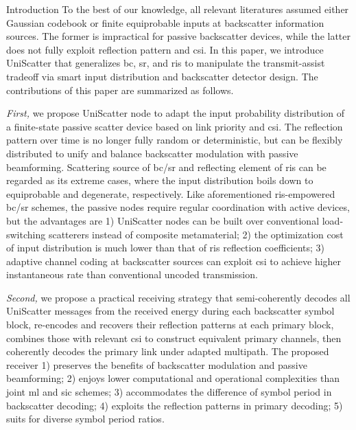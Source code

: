 \documentclass[journal]{IEEEtran}
\begin{document}
\begin{section}{Introduction}
	To the best of our knowledge, all relevant literatures assumed either Gaussian codebook \cite{Guo2019b,Ding2020,Long2020a,Zhou2019a,Wu2021a,Xu2021a,Yang2021a,Hu2021b} or finite equiprobable inputs \cite{Yang2018,Liang2020,Han2021,Zhang2022,Liu2019d,Bereyhi2020,Xu2020b,Zhang2021d,Hua2022,Basar2020,Ma2020a,Yuan2021,Hu2021a} at backscatter information sources.
	The former is impractical for passive backscatter devices, while the latter does not fully exploit reflection pattern and \gls{csi}.
	In this paper, we introduce UniScatter that generalizes \gls{bc}, \gls{sr}, and \gls{ris} to manipulate the transmit-assist tradeoff via smart input distribution and backscatter detector design.
	The contributions of this paper are summarized as follows.

	\emph{First,} we propose UniScatter node to adapt the input probability distribution of a finite-state passive scatter device based on link priority and \gls{csi}.
	The reflection pattern over time is no longer fully random or deterministic, but can be flexibly distributed to unify and balance backscatter modulation with passive beamforming.
	Scattering source of \gls{bc}/\gls{sr} and reflecting element of \gls{ris} can be regarded as its extreme cases, where the input distribution boils down to equiprobable and degenerate, respectively.
	Like aforementioned \gls{ris}-empowered \gls{bc}/\gls{sr} schemes, the passive nodes require regular coordination with active devices, but the advantages are 1) UniScatter nodes can be built over conventional load-switching scatterers instead of composite metamaterial; 2) the optimization cost of input distribution is much lower than that of \gls{ris} reflection coefficients; 3) adaptive channel coding at backscatter sources can exploit \gls{csi} to achieve higher instantaneous rate than conventional uncoded transmission.

	\emph{Second,} we propose a practical receiving strategy that semi-coherently decodes all UniScatter messages from the received energy during each backscatter symbol block, re-encodes and recovers their reflection patterns at each primary block, combines those with relevant \gls{csi} to construct equivalent primary channels, then coherently decodes the primary link under adapted multipath.
	The proposed receiver 1) preserves the benefits of backscatter modulation and passive beamforming; 2) enjoys lower computational and operational complexities than joint \gls{ml} and \gls{sic} schemes; 3) accommodates the difference of symbol period in backscatter decoding; 4) exploits the reflection patterns in primary decoding; 5) suits for diverse symbol period ratios.


\end{section}
\end{document}

